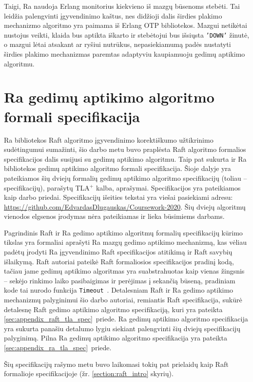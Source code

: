 \documentclass{VUMIFPSkursinis}
\begin{document}
Taigi, Ra naudoja Erlang monitorius kiekvieno iš mazgų būsenoms stebėti. Tai leidžia palengvinti įgyvendinimo kaštus, nes didžioji dalis širdies plakimo mechanizmo algoritmo yra paimama iš Erlang OTP bibliotekos. Mazgui netikėtai nustojus veikti, klaida bus aptikta iškarto ir stebėtojui bus išsiųsta \texttt{'DOWN'} žinutė, o mazgui lėtai atsakant ar ryšiui nutrūkus, nepasiekiamumą padės nustatyti širdies plakimo mechanizmas paremtas adaptyviu kaupiamuoju gedimų aptikimo algoritmu.

\section{Ra gedimų aptikimo algoritmo formali specifikacija}

Ra bibliotekos Raft algoritmo įgyvendinimo korektiškumo užtikrinimo sudėtingumui sumažinti, šio darbo metu buvo praplėsta Raft algoritmo formalios specifikacijos dalis susijusi su gedimų aptikimo algoritmu. Taip pat sukurta ir Ra bibliotekos gedimų aptikimo algoritmo formali specifikacija. Šioje dalyje yra pateikiamos šių dviejų formalių gedimų aptikimo algoritmo specifikacijų (toliau -- specifikacijų), parašytų TLA$^+$ kalba, aprašymai. Specifikacijos yra pateikiamos kaip darbo priedai. Specifikacijų išeities tekstai yra viešai pasiekiami adresu: \url{https://github.com/EdvardasDlugauskas/Coursework-2020}. Šių dviejų algoritmų vienodos elgsenos įrodymas nėra pateikiamas ir lieka būsimiems darbams. 

Pagrindinis Raft ir Ra gedimo aptikimo algoritmų formalių specifikacijų kūrimo tikslas yra formaliai aprašyti Ra mazgų gedimo aptikimo mechanizmą, kas vėliau padėtų įrodyti Ra įgyvendinimo Raft specifikacijos atitikimą ir Raft savybių išlaikymą. Raft autoriai pateikė Raft formaliosios specifikacijos pradinį kodą, tačiau jame gedimų aptikimo algoritmas yra suabstrahuotas kaip vienas žingsnis -- sekėjo rinkimo laiko pasibaigimas ir perėjimas į sekančią būseną, pradiniam kode tai nurodo funkcija \texttt{Timeout}~\cite{ongaro_consensus}. Detalesniam Raft ir Ra gedimo aptikimo mechanizmų palyginimui šio darbo autoriai, remiantis Raft specifikacija, sukūrė detalesnę Raft gedimo aptikimo algoritmo specifikaciją, kuri yra pateikta \ref{sec:appendix_raft_tla_spec}~priede. Ra gedimų aptikimo algoritmo specifikacija yra sukurta panašiu detalumo lygiu siekiant palengvinti šių dviejų specifikacijų palyginimą. Pilna Ra gedimų aptikimo algoritmo specifikacija yra pateikta \ref{sec:appendix_ra_tla_spec}~priede.

Šių specifikacijų rašymo metu buvo laikomasi tokių pat prielaidų kaip Raft formalioje specifikacijoje (žr. \ref{section:raft_intro} skyrių).
\end{document}
